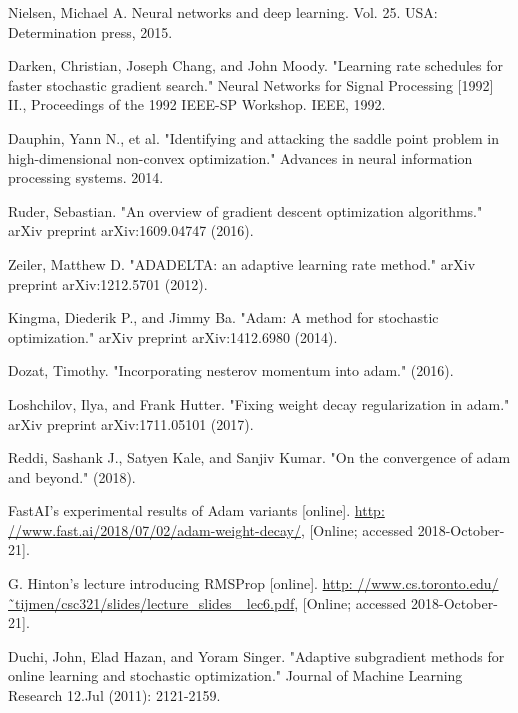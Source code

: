 \documentclass[12pt, titlepage]{article}
\begin{document}
\begin{thebibliography}{0}
   Nielsen, Michael A. Neural networks and deep learning. Vol. 25. USA: Determination press, 2015.
  
   Darken, Christian, Joseph Chang, and John Moody. "Learning rate schedules for faster stochastic gradient search." Neural Networks for Signal Processing [1992] II., Proceedings of the 1992 IEEE-SP Workshop. IEEE, 1992.
  
   Dauphin, Yann N., et al. "Identifying and attacking the saddle point problem in high-dimensional non-convex optimization." Advances in neural information processing systems. 2014.
  
   Ruder, Sebastian. "An overview of gradient descent optimization algorithms." arXiv preprint arXiv:1609.04747 (2016).
  
   Zeiler, Matthew D. "ADADELTA: an adaptive learning rate method." arXiv preprint arXiv:1212.5701 (2012).
  
   Kingma, Diederik P., and Jimmy Ba. "Adam: A method for stochastic optimization." arXiv preprint arXiv:1412.6980 (2014).
  
   Dozat, Timothy. "Incorporating nesterov momentum into adam." (2016).
  
   Loshchilov, Ilya, and Frank Hutter. "Fixing weight decay regularization in adam." arXiv preprint arXiv:1711.05101 (2017).
  
   Reddi, Sashank J., Satyen Kale, and Sanjiv Kumar. "On the convergence of adam and beyond." (2018).
  
   FastAI’s experimental results of Adam variants [online]. \url{http:
//www.fast.ai/2018/07/02/adam-weight-decay/}, [Online; accessed
2018-October-21].

   G. Hinton’s lecture introducing RMSProp [online]. \url{http:
//www.cs.toronto.edu/˜tijmen/csc321/slides/lecture_slides_
lec6.pdf}, [Online; accessed 2018-October-21].

   Duchi, John, Elad Hazan, and Yoram Singer. "Adaptive subgradient methods for online learning and stochastic optimization." Journal of Machine Learning Research 12.Jul (2011): 2121-2159.


  
  
  
  
  \end{thebibliography}


 
\end{document}
